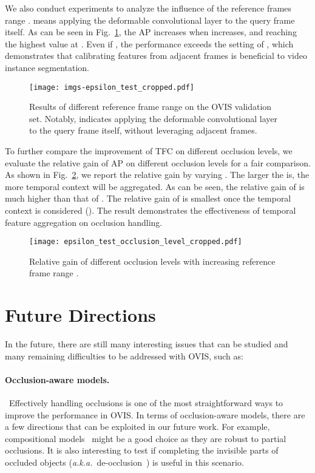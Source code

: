\documentclass[twocolumn]{svjour3}          \smartqed  \usepackage{graphicx}
\def\myTextColor{\textcolor[rgb]{0, 0, 0}}
\begin{document}
\begin{sloppypar}
We also conduct experiments to analyze the influence of the reference frames range .  means applying the deformable convolutional layer to the query frame itself. As can be seen in Fig.~\ref{fig:epsilon}, the AP increases when  increases, and reaching the highest value at . Even if , the performance exceeds the setting of , which demonstrates that calibrating features from adjacent frames is beneficial to video instance segmentation.

\begin{figure}[t]
\centering
  \texttt{[image: imgs-epsilon\_test\_cropped.pdf]}
  \caption{Results of different reference frame range  on the OVIS validation set. Notably,  indicates applying the deformable convolutional layer to the query frame itself, without leveraging adjacent frames.}
\label{fig:epsilon}
\end{figure}

\myTextColor{To further compare the improvement of TFC on different occlusion levels, we evaluate the relative gain of AP on different occlusion levels for a fair comparison. As shown in Fig.~\ref{fig:epsilon_test_occlusion_level}, we report the relative gain by varying . The larger the  is, the more temporal context will be aggregated. As can be seen, the relative gain of  is much higher than that of . The relative gain of  is smallest once the temporal context is considered (). The result demonstrates the effectiveness of temporal feature aggregation on occlusion handling.}

\begin{figure}
\centering
\texttt{[image: epsilon\_test\_occlusion\_level\_cropped.pdf]}
\caption{\myTextColor{Relative gain of different occlusion levels with increasing reference frame range .}}
\label{fig:epsilon_test_occlusion_level}
\end{figure}


\section{\myTextColor{Future Directions}}
\label{sec:future_directions}

\myTextColor{In the future, there are still many interesting issues that can be studied and many remaining difficulties to be addressed with OVIS, such as:}

\paragraph{\myTextColor{Occlusion-aware models.}}~\myTextColor{Effectively handling occlusions is one of the most straightforward ways to improve the performance in OVIS. In terms of occlusion-aware models, there are a few directions that can be exploited in our future work. For example, compositional models~\cite{compositional,compositional2,compositional3} might be a good choice as they are robust to partial occlusions. It is also interesting to test if completing the invisible parts of occluded objects (\emph{a.k.a.}~de-occlusion~\cite{deocclusion}) is useful in this scenario.}


\end{sloppypar}
\end{document}
